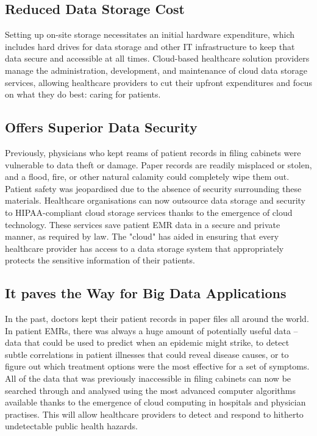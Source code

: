 \documentclass[12pt]{article}
\begin{document}
\subsection{Reduced Data Storage Cost}
Setting up on-site storage necessitates an initial hardware expenditure, which includes hard drives for data storage and other IT infrastructure to keep that data secure and accessible at all times. Cloud-based healthcare solution providers manage the administration, development, and maintenance of cloud data storage services, allowing healthcare providers to cut their upfront expenditures and focus on what they do best: caring for patients.

\subsection{Offers Superior Data Security}
Previously, physicians who kept reams of patient records in filing cabinets were vulnerable to data theft or damage. Paper records are readily misplaced or stolen, and a flood, fire, or other natural calamity could completely wipe them out. Patient safety was jeopardised due to the absence of security surrounding these materials. Healthcare organisations can now outsource data storage and security to HIPAA-compliant cloud storage services thanks to the emergence of cloud technology. These services save patient EMR data in a secure and private manner, as required by law. The "cloud" has aided in ensuring that every healthcare provider has access to a data storage system that appropriately protects the sensitive information of their patients.

\subsection{It paves the Way for Big Data Applications}
In the past, doctors kept their patient records in paper files all around the world. In patient EMRs, there was always a huge amount of potentially useful data – data that could be used to predict when an epidemic might strike, to detect subtle correlations in patient illnesses that could reveal disease causes, or to figure out which treatment options were the most effective for a set of symptoms. All of the data that was previously inaccessible in filing cabinets can now be searched through and analysed using the most advanced computer algorithms available thanks to the emergence of cloud computing in hospitals and physician practises. This will allow healthcare providers to detect and respond to hitherto undetectable public health hazards.
\end{document}
